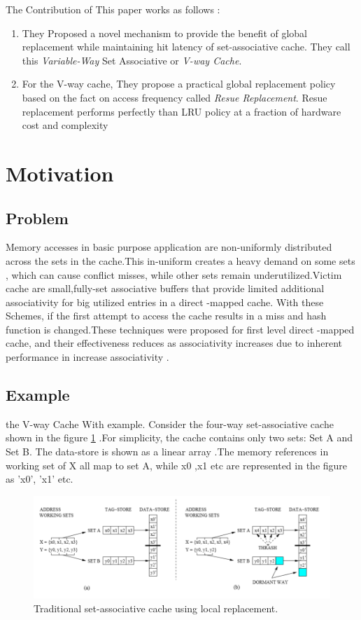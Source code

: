 \documentclass{report}
\begin{document}
\vspace{5cm}
The Contribution of This paper works as follows :
\begin{enumerate}
\item They Proposed a novel mechanism to provide the benefit of global replacement while maintaining hit latency of set-associative cache. They call this \emph{Variable-Way} Set Associative or \emph{V-way Cache}.
\item For the V-way cache, They propose a practical global replacement policy based on the fact on access frequency called \emph{Resue Replacement}. Resue replacement performs perfectly than LRU policy at a fraction of hardware cost and complexity 

\end{enumerate}

\section{Motivation}
\subsection{Problem}

Memory accesses in basic purpose application are non-uniformly distributed across the sets in the cache.This in-uniform creates a heavy demand on some sets , which can cause conflict misses, while other sets remain underutilized.Victim cache are small,fully-set associative buffers that provide limited additional associativity for big utilized entries in a direct -mapped cache.
\vspace{.8cm}
With these Schemes, if the first attempt to access the cache results in a miss and hash function is changed.These techniques were proposed for first level direct -mapped cache, and their  effectiveness reduces as associativity increases due to inherent performance in increase associativity .
\subsection{Example}
the V-way Cache With example. Consider the four-way
set-associative cache shown in the figure \ref{fig2} .For simplicity, the cache contains only two sets: Set A and Set B. The data-store is shown as a linear array .The memory references in working set of X all map to set A, while x0 ,x1 etc are represented in the figure as 'x0', 'x1' etc.
\vspace{1cm}
\begin{figure}[h!]
\includegraphics[width=1\textwidth]{./fig2}
\caption{ Traditional set-associative cache using local replacement.
}
\label{fig2}
\end{figure}
\end{document}
